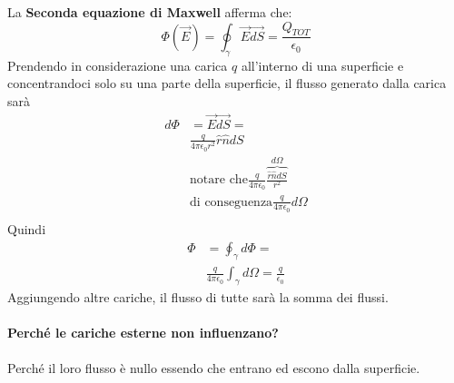\documentclass{book}
\begin{document}
La \textbf{Seconda equazione di Maxwell} afferma che: \[\Phi(\vec{E}) = \oint_{\gamma}\vec{E}\vec{dS} = \frac{Q_{TOT}}{\epsilon_0}\]
Prendendo in considerazione una carica $q$ all'interno di una superficie e concentrandoci solo su una parte della superficie, il flusso generato dalla carica sarà 
\[
\begin{split}
	d\Phi &= \vec{E}\vec{dS}= \\
	&\frac{q}{4\pi\epsilon_0r^2}\hat{r}\hat{n}dS \\
	&\text{notare che}
	\frac{q}{4\pi \epsilon_0}\overbrace{\frac{\hat{r}\hat{n}dS}{r^2}}^{d\Omega} \\
	&\text{di conseguenza} 
	\frac{q}{4\pi \epsilon_0}d\Omega \\
\end{split}
\]
Quindi
\[
\begin{split}
\Phi &= \oint_{\gamma} d\Phi = \\
&\frac{q}{4\pi \epsilon_0}\int_{\gamma}d\Omega = \frac{q}{\epsilon_0}
\end{split}
\]
Aggiungendo altre cariche, il flusso di tutte sarà la somma dei flussi.
\paragraph{Perché le cariche esterne non influenzano?}
Perché il loro flusso è nullo essendo che entrano ed escono dalla superficie.
\end{document}
